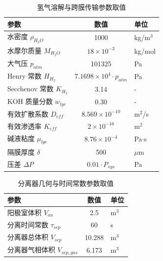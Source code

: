 \begin{table}[!htbp]
  \centering
  \caption{氢气溶解与跨膜传输参数取值}
  \label{tab:params_mass_transfer}
  \small
  \begin{tabular}{@{}l c l@{}}
    \toprule
    \textbf{参数} & \textbf{数值} & \textbf{单位} \\
    \midrule
    水密度 $\rho_{H_2O}$ & 1000 & kg/$\mathrm{m}^3$ \\
    水摩尔质量 $M_{H_2O}$ & $18 \times 10^{-3}$ & kg/mol \\
    大气压 $p_{atm}$ & 101325 & Pa \\
    Henry 常数 $H_{H_2}$ & $7.1698 \times 10^{4}\cdot p_{atm}$ & Pa \\
    Secchenov 常数 $K_{H_2}$ & 3.14 & - \\
    KOH 质量分数 $w_{lye}$ & 0.30 & - \\
    \addlinespace
    有效扩散系数 $D_{eff}$ & $8.569 \times 10^{-10}$ & $\mathrm{m}^2$/s \\
    有效渗透率 $K_{eff}$ & $2 \times 10^{-16}$ & $\mathrm{m}^2$ \\
    碱液粘度 $\mu_{lye}$ & $8.76 \times 10^{-4}$ & Pa$\cdot$s \\
    隔膜厚度 $\delta$ & 500 & $\mu$m \\
    压差 $\Delta P$ & $0.01 \cdot P_{sys}$ & Pa \\
    \bottomrule
  \end{tabular}
\end{table}

\begin{table}[!htbp]
  \centering
  \caption{分离器几何与时间常数参数取值}
  \label{tab:params_separator}
  \small
  \begin{tabular}{@{}l c l@{}}
    \toprule
    \textbf{参数} & \textbf{数值} & \textbf{单位} \\
    \midrule
    阳极室体积 $V_{an}$ & 2.5 & $\mathrm{m}^3$ \\
    分离时间常数 $\tau_{sep}$ & 60 & s \\
    分离器总体积 $V_{sep}$ & 10.288 & $\mathrm{m}^3$ \\
    分离器气相体积 $V_{sep,gas}$ & 6.173 & $\mathrm{m}^3$ \\
    \bottomrule
  \end{tabular}
\end{table}

